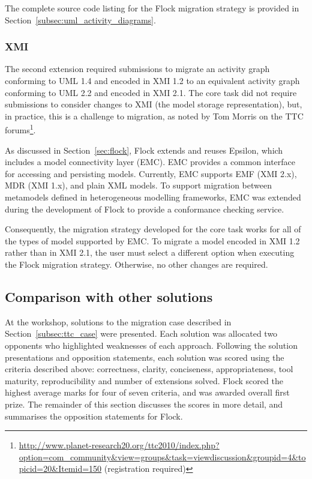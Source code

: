 The complete source code listing for the Flock migration strategy is provided in Section~\ref{subsec:uml_activity_diagrams}.

\subsubsection{XMI}
\label{sec:xmi}
The second extension required submissions to migrate an activity graph conforming to UML 1.4 and encoded in XMI 1.2 to an equivalent activity graph conforming to UML 2.2 and encoded in XMI 2.1. The core task did not require submissions to consider changes to XMI (the model storage representation), but, in practice, this is a challenge to migration, as noted by Tom Morris on the TTC forums\footnote{\url{http://www.planet-research20.org/ttc2010/index.php?option=com_community&view=groups&task=viewdiscussion&groupid=4&topicid=20&Itemid=150} (registration required)}.

As discussed in Section~\ref{sec:flock}, Flock extends and reuses Epsilon, which includes a model connectivity layer (EMC). EMC provides a common interface for accessing and persisting models. Currently, EMC supports EMF (XMI 2.x), MDR (XMI 1.x), and plain XML models. To support migration between metamodels defined in heterogeneous modelling frameworks, EMC was extended during the development of Flock to provide a conformance checking service.

Consequently, the migration strategy developed for the core task works for all of the types of model supported by EMC. To migrate a model encoded in XMI 1.2 rather than in XMI 2.1, the user must select a different option when executing the Flock migration strategy. Otherwise, no other changes are required.

\subsection{Comparison with other solutions}
At the workshop, solutions to the migration case described in Section~\ref{subsec:ttc_case} were presented. Each solution was allocated two opponents who highlighted weaknesses of each approach. Following the solution presentations and opposition statements, each solution was scored using the criteria described above: correctness, clarity, conciseness, appropriateness, tool maturity, reproducibility and number of extensions solved. Flock scored the highest average marks for four of seven criteria, and was awarded overall first prize. The remainder of this section discusses the scores in more detail, and summarises the opposition statements for Flock.


